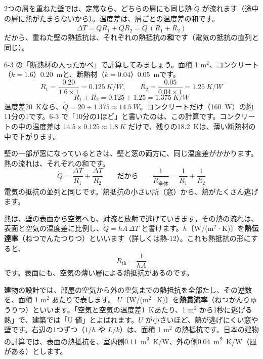 2つの層を重ねた壁では、定常なら、どちらの層にも同じ熱 $\dot Q$ が流れます（途中の層に熱がたまらないから）。温度差は、層ごとの温度差の和です。
\[\Delta T=\dot Q R_1+\dot Q R_2=\dot Q\,(R_1+R_2)\]
だから、重ねた壁の熱抵抗は、それぞれの熱抵抗の\textbf{和}です（電気の抵抗の直列と同じ）。

6-3 の「断熱材の入ったかべ」で計算してみましょう。面積 1 m$^2$、コンクリート（$k=1.6$）\qty{0.20}{m}と、断熱材（$k=0.04$）\qty{0.05}{m}です。
\[R_1=\frac{0.20}{1.6\times1}=\qty{0.125}{K/W},\qquad R_2=\frac{0.05}{0.04\times1}=\qty{1.25}{K/W}\]
\[R_1+R_2=0.125+1.25=\qty{1.375}{K/W}\]
温度差\qty{20}{K}なら、$\dot Q=20\div1.375\approx\qty{14.5}{W}$。コンクリートだけ（\qty{160}{W}）の約11分の1です。6-3 で「10分の1ほど」と書いたのは、この計算です。コンクリートの中の温度差は $14.5\times0.125\approx\qty{1.8}{K}$ だけで、残りの\qty{18.2}{K}は、薄い断熱材の中で下がります。

壁の一部が窓になっているときは、壁と窓の両方に、同じ温度差がかかります。熱の流れは、それぞれの和です。
\[\dot Q=\frac{\Delta T}{R_1}+\frac{\Delta T}{R_2}\qquad\text{だから}\qquad\frac{1}{R_{\text{全体}}}=\frac{1}{R_1}+\frac{1}{R_2}\]
電気の抵抗の並列と同じです。熱抵抗の小さい所（窓）から、熱がたくさん逃げます。

熱は、壁の表面から空気へも、対流と放射で逃げていきます。その熱の流れは、表面と空気の温度差に比例し、$\dot Q=hA\,\Delta T$ と書けます。$h$〔W/(m$^2$·K)〕を\textbf{熱伝達率}（ねつでんたつりつ）といいます（詳しくは熱-12）。これも熱抵抗の形にすると、
\[R_{\mathrm{th}}=\frac{1}{hA}\]
です。表面にも、空気の薄い層による熱抵抗があるのです。

\begin{phmodel}[熱抵抗の直列・並列]
\end{phmodel}

\label{ph:熱-11:sec4}
建物の設計では、部屋の空気から外の空気までの熱抵抗を全部たし、その逆数を、面積 1 m$^2$ あたりで表します。
$U$〔W/(m$^2$·K)〕を\textbf{熱貫流率}（ねつかんりゅうりつ）といいます。「空気と空気の温度差\qty{1}{K}あたり、1 m$^2$ から1秒に逃げる熱」で、建築では「U 値」とよばれます。$U$ が小さいほど、熱が逃げにくい窓や壁です。右辺の1つずつ（$1/h$ や $L/k$）は、面積 1 m$^2$ の熱抵抗です。日本の建物の計算では、表面の熱抵抗を、室内側\qty{0.11}{m^2.K/W}、外の側\qty{0.04}{m^2.K/W}（風がある）とします。

